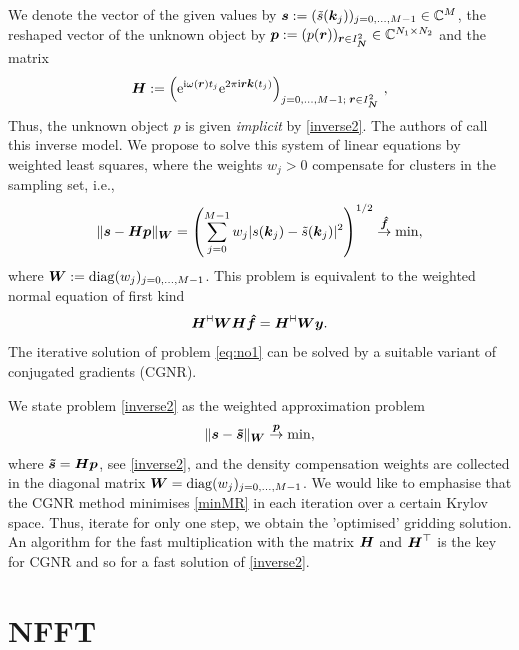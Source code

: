 \documentclass[journal]{IEEEtran}
\def\ti{\mbox{\scriptsize{\rm i}}}
\newcommand{\eip}[1]{{\rm e}^{ 2\pi{\ti} #1}}
\newcommand{\zb}[1]{\mbox{\boldmath{${#1}$}}}
\newcommand{\zbs}[1]{\mbox{\boldmath\scriptsize{${#1}$}}}
\newcommand{\zbss}[1]{\mbox{\boldmath\tiny{${#1}$}}}
\newcommand{\diag}{{\rm diag}}
\newcommand{\adj}{{\vdash \hspace*{-1.72mm} \dashv}}
\numberwithin{equation}{section}
\numberwithin{table}{section}
\numberwithin{figure}{section}
\begin{document}
We denote the vector of the given values by $\zb {s}:=(\tilde s({\zb k_j}))_{j=0,\ldots,M-1}\in \mathbb{C}^{M}$,
the reshaped vector of the unknown object by $\zb {p}:=(p({\zb r}))_{\zbs r\in I_{\zbss N}^2} \in
\mathbb{C}^{N_1\times N_2}$ and the matrix 
\begin{equation}\label{MatrixB}
\zb H:=\left({\rm e}^{{\rm\scriptsize i}\omega(\zbs r)t_j} \eip{\zbs r\zbs k(t_j)}\right)_{j=0,\hdots,M-1;\;\zbs r\in
  I_{\zbss N}^2}\, ,
\end{equation}
Thus, the unknown object $p$ is given {\em implicit} by \eqref{inverse2}.
The authors of \cite{DeWaLe02} call this inverse model.
We propose to solve this system of linear equations by weighted least
squares, where the 
weights $w_j> 0$ compensate for clusters in the sampling set, i.e.,
\begin{equation} \label{eq:min}
  \|\zb s - \zb H \zb  p\|_{\zbs W}
  = \left(\sum_{j=0}^{M-1} w_j |s(\zb k_j)-\tilde s(\zb k_j)|^2\right)^{1/2}
  \stackrel{\zbs {\hat f}}{\rightarrow} \min,
\end{equation}
where $\zb W:=\diag(w_j)_{j=0,\ldots,M-1}$.
This problem is equivalent to the weighted normal equation of first kind
\begin{equation}
  \label{eq:no1}
  \zb H^{\adj} \zb W \zb H \zb {\hat f} = \zb H^{\adj} \zb W \zb y.
\end{equation}
The iterative solution of problem \eqref{eq:no1} can be solved 
by a suitable variant of conjugated gradients (CGNR). 

We state problem \eqref{inverse2} as the weighted approximation problem
\begin{equation}\label{minMR}
  \|\zb s - \zb {\tilde s}\|_{\zbs W}
  \stackrel{\zbs {p}}{\rightarrow} \min,
\end{equation}
where $\zb {\tilde s}=\zb H\zb p$, see \eqref{inverse2}, and the density compensation weights are collected in the diagonal matrix
$\zb W=\diag(w_j)_{j=0,\ldots,M-1}$. 
We would like to emphasise that the CGNR method minimises \eqref{minMR} in each iteration over a certain Krylov space.
Thus, iterate for only one step, we obtain the 'optimised' gridding
solution.
An algorithm for the fast multiplication with the matrix $\zb H$ and
$\zb H^{\top}$  is the key for CGNR and so for a fast solution of \eqref{inverse2}.

\section{NFFT}\label{Sec:NFFT}
\end{document}
